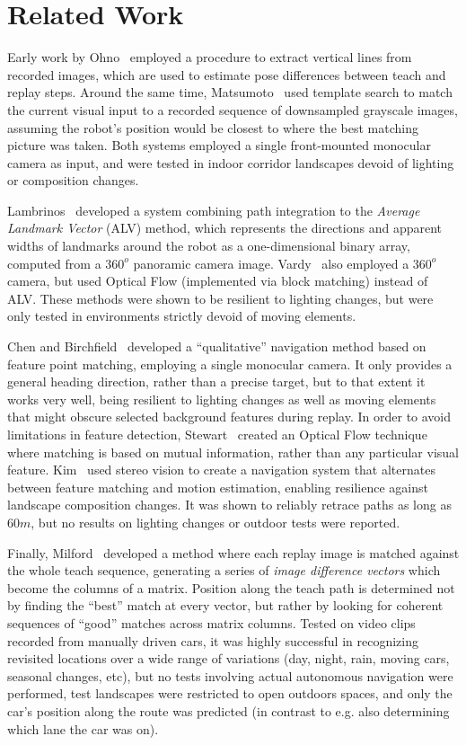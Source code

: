 \documentclass[twocolumn, 9pt,fleqn]{jsproceedings}
\begin{document}
\section{Related Work}

Early work by Ohno~\cite{OYA96} employed a procedure to extract vertical lines from recorded images, which are used to estimate pose differences between teach and replay steps. Around the same time, Matsumoto~\cite{MAT96} used template search to match the current visual input to a recorded sequence of downsampled grayscale images, assuming the robot's position would be closest to where the best matching picture was taken. Both systems employed a single front-mounted monocular camera as input, and were tested in indoor corridor landscapes devoid of lighting or composition changes.

Lambrinos~\cite{LAM00} developed a system combining path integration to the \textit{Average Landmark Vector} (ALV) method, which represents the directions and apparent widths of landmarks around the robot as a one-dimensional binary array, computed from a $360^o$ panoramic camera image. Vardy~\cite{VAR05} also employed a $360^o$ camera, but used Optical Flow (implemented via block matching) instead of ALV. These methods were shown to be resilient to lighting changes, but were only tested in environments strictly devoid of moving elements.

Chen and Birchfield~\cite{CHE06} developed a ``qualitative'' navigation method based on feature point matching, employing a single monocular camera. It only provides a general heading direction, rather than a precise target, but to that extent it works very well, being resilient to lighting changes as well as moving elements that might obscure selected background features during replay. In order to avoid limitations in feature detection, Stewart~\cite{STE12} created an Optical Flow technique where matching is based on mutual information, rather than any particular visual feature. Kim~\cite{KIM08} used stereo vision to create a navigation system that alternates between feature matching and motion estimation, enabling resilience against landscape composition changes. It was shown to reliably retrace paths as long as $60m$, but no results on lighting changes or outdoor tests were reported.

Finally, Milford~\cite{MIL12} developed a method where each replay image is matched against the whole teach sequence, generating a series of \textit{image difference vectors} which become the columns of a matrix. Position along the teach path is determined not by finding the ``best'' match at every vector, but rather by looking for coherent sequences of ``good'' matches across matrix columns. Tested on video clips recorded from manually driven cars, it was highly successful in recognizing revisited locations over a wide range of variations (day, night, rain, moving cars, seasonal changes, etc), but no tests involving actual autonomous navigation were performed, test landscapes were restricted to open outdoors spaces, and only the car's position along the route was predicted (in contrast to e.g. also determining which lane the car was on).
\end{document}
